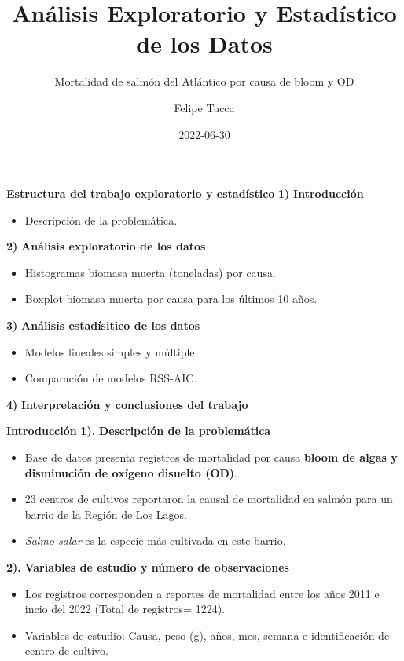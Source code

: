 \documentclass[
  ignorenonframetext,
]{beamer}
\title{Análisis Exploratorio y Estadístico de los Datos}
\subtitle{Mortalidad de salmón del Atlántico por causa de bloom y OD}
\author{Felipe Tucca}
\date{2022-06-30}
\institute{Instituto Tecnológico del Salmón}
\providecommand{\tightlist}{%
  \setlength{\itemsep}{0pt}\setlength{\parskip}{0pt}}
\begin{document}
\frame{\titlepage}

\begin{frame}{\textbf{Estructura del trabajo exploratorio y
estadístico}}
\protect\hypertarget{estructura-del-trabajo-exploratorio-y-estaduxedstico}{}
\textbf{1)} \textbf{Introducción}

\begin{itemize}
\tightlist
\item
  Descripción de la problemática.
\end{itemize}

\textbf{2)} \textbf{Análisis exploratorio de los datos}

\begin{itemize}
\tightlist
\item
  Histogramas biomasa muerta (toneladas) por causa.
\item
  Boxplot biomasa muerta por causa para los últimos 10 años.
\end{itemize}

\textbf{3)} \textbf{Análisis estadísitico de los datos}

\begin{itemize}
\tightlist
\item
  Modelos lineales simples y múltiple.
\item
  Comparación de modelos RSS-AIC.
\end{itemize}

\textbf{4)} \textbf{Interpretación y conclusiones del trabajo}
\end{frame}

\begin{frame}{\textbf{Introducción}}
\protect\hypertarget{introducciuxf3n}{}
\textbf{1).} \textbf{Descripción de la problemática}

\begin{itemize}
\item
  Base de datos presenta registros de mortalidad por causa \textbf{bloom
  de algas y disminución de oxígeno disuelto (OD)}.
\item
  23 centros de cultivos reportaron la causal de mortalidad en salmón
  para un barrio de la Región de Los Lagos.
\item
  \emph{Salmo salar} es la especie más cultivada en este barrio.
\end{itemize}

\textbf{2).} \textbf{Variables de estudio y número de observaciones}

\begin{itemize}
\item
  Los registros corresponden a reportes de mortalidad entre los años
  2011 e incio del 2022 (Total de registros= 1224).
\item
  Variables de estudio: Causa, peso (g), años, mes, semana e
  identificación de centro de cultivo.
\end{itemize}
\end{frame}
\end{document}
